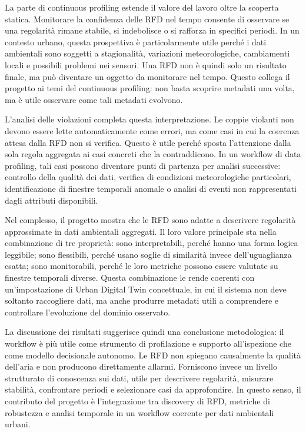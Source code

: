 \documentclass[a4paper,12pt]{article}
\begin{document}
La parte di continuous profiling estende il valore del lavoro oltre la scoperta statica. Monitorare la confidenza delle RFD nel tempo consente di osservare se una regolarità rimane stabile, si indebolisce o si rafforza in specifici periodi. In un contesto urbano, questa prospettiva è particolarmente utile perché i dati ambientali sono soggetti a stagionalità, variazioni meteorologiche, cambiamenti locali e possibili problemi nei sensori. Una RFD non è quindi solo un risultato finale, ma può diventare un oggetto da monitorare nel tempo. Questo collega il progetto ai temi del continuous profiling: non basta scoprire metadati una volta, ma è utile osservare come tali metadati evolvono.

L'analisi delle violazioni completa questa interpretazione. Le coppie violanti non devono essere lette automaticamente come errori, ma come casi in cui la coerenza attesa dalla RFD non si verifica. Questo è utile perché sposta l'attenzione dalla sola regola aggregata ai casi concreti che la contraddicono. In un workflow di data profiling, tali casi possono diventare punti di partenza per analisi successive: controllo della qualità dei dati, verifica di condizioni meteorologiche particolari, identificazione di finestre temporali anomale o analisi di eventi non rappresentati dagli attributi disponibili.

Nel complesso, il progetto mostra che le RFD sono adatte a descrivere regolarità approssimate in dati ambientali aggregati. Il loro valore principale sta nella combinazione di tre proprietà: sono interpretabili, perché hanno una forma logica leggibile; sono flessibili, perché usano soglie di similarità invece dell'uguaglianza esatta; sono monitorabili, perché le loro metriche possono essere valutate su finestre temporali diverse. Questa combinazione le rende coerenti con un'impostazione di Urban Digital Twin concettuale, in cui il sistema non deve soltanto raccogliere dati, ma anche produrre metadati utili a comprendere e controllare l'evoluzione del dominio osservato.

La discussione dei risultati suggerisce quindi una conclusione metodologica: il workflow è più utile come strumento di profilazione e supporto all'ispezione che come modello decisionale autonomo. Le RFD non spiegano causalmente la qualità dell'aria e non producono direttamente allarmi. Forniscono invece un livello strutturato di conoscenza sui dati, utile per descrivere regolarità, misurare stabilità, confrontare periodi e selezionare casi da approfondire. In questo senso, il contributo del progetto è l'integrazione tra discovery di RFD, metriche di robustezza e analisi temporale in un workflow coerente per dati ambientali urbani.
\end{document}
